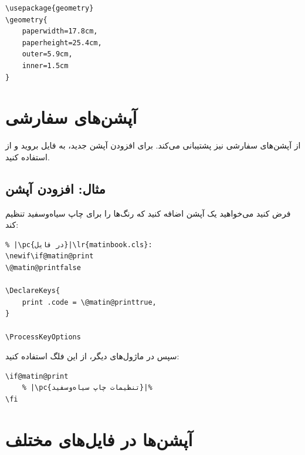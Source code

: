 \begin{latin}
\begin{verbatim}
\usepackage{geometry}
\geometry{
    paperwidth=17.8cm,
    paperheight=25.4cm,
    outer=5.9cm,
    inner=1.5cm
}
\end{verbatim}
\end{latin}


\section{آپشن‌های سفارشی}
\label{sec:options-custom}

 از آپشن‌های سفارشی نیز پشتیبانی
می‌کند. برای افزودن آپشن جدید، به فایل
 بروید و از
 استفاده کنید.

\subsection{مثال: افزودن آپشن }
\label{sec:options-custom-example}

فرض کنید می‌خواهید یک آپشن  اضافه
کنید که رنگ‌ها را برای چاپ سیاه‌وسفید تنظیم
کند:

\begin{latin}
\begin{verbatim}
% |\pc{در فایل}|\lr{matinbook.cls}:
\newif\if@matin@print
\@matin@printfalse

\DeclareKeys{
    print .code = \@matin@printtrue,
}

\ProcessKeyOptions
\end{verbatim}
\end{latin}

سپس در ماژول‌های دیگر، از این فلگ استفاده
کنید:

\begin{latin}
\begin{verbatim}
\if@matin@print
    % |\pc{تنظیمات چاپ سیاه‌وسفید}|%
\fi
\end{verbatim}
\end{latin}


\section{آپشن‌ها در فایل‌های مختلف}
\label{sec:options-files}

